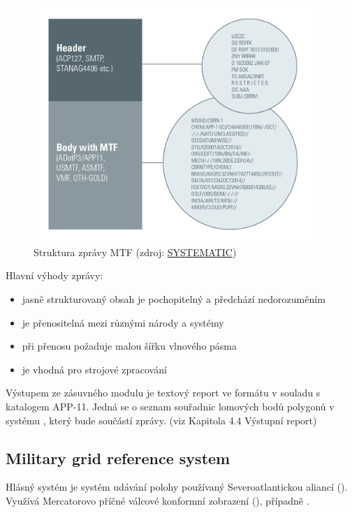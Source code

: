 \begin{figure}[H]
    \centering
      \includegraphics[width=300pt]{./pictures/Military-Messaging-white-borders-988px.png}
      \caption[Struktura zprávy MTF]{Struktura zprávy MTF
      (zdroj: \href{https://systematic.com/defence/products/a/military-messaging/app-11-and-adatp-3/}{SYSTEMATIC})}
      \label{fig:systematic}
  \end{figure}
  
Hlavní výhody  zprávy:

\begin{itemize}
	\item jasně strukturovaný obsah je pochopitelný a předchází nedorozuměním
	\item je přenositelná mezi různými národy a systémy 
	\item při přenosu požaduje malou šířku vlnového pásma
	\item je vhodná pro strojové zpracování
\end{itemize}

Výstupem ze zásuvného modulu je textový report ve formátu v souladu s
katalogem APP-11. Jedná se o seznam souřadnic lomových bodů polygonů v
systému , který bude součástí  zprávy. (viz Kapitola
4.4 Výstupní report)

\subsection{Military grid reference system}

Hlásný systém  je systém udávání polohy používaný
Severoatlantickou aliancí (). Využívá Mercatorovo příčné
válcové konformní zobrazení (), případně .

